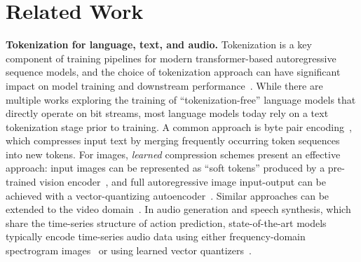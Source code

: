 \section{Related Work}
\label{sec:related}


\noindent\textbf{Tokenization for language, text, and audio.}
Tokenization is a key component of training pipelines for modern transformer-based autoregressive sequence models, and the choice of tokenization approach can have significant impact on model training and downstream performance~\cite{radford2019language}. While there are multiple works exploring the training of ``tokenization-free'' language models \citep{gillick2016bytelm, meta_blt} that directly operate on bit streams, most language models today rely on a text tokenization stage prior to training. 
A common approach is byte pair encoding~\citep{gage1994new, radford2019language}, which compresses input text by merging frequently occurring token sequences into new tokens. For images, \emph{learned} compression schemes present an effective approach: input images can be represented as ``soft tokens'' produced by a pre-trained vision encoder~\citep{liu2023llava}, and full autoregressive image input-output can be achieved with a vector-quantizing autoencoder~\cite{esser2020taming, vqvae}. Similar approaches can be extended to the video domain~\cite{yu2023magvit}. In audio generation and speech synthesis, which share the time-series structure of action prediction, state-of-the-art models typically encode time-series audio data using either frequency-domain spectrogram images~\citep{gong21b_interspeech} or using learned vector quantizers~\citep{zeghidour2021soundstreamendtoendneuralaudio}.


